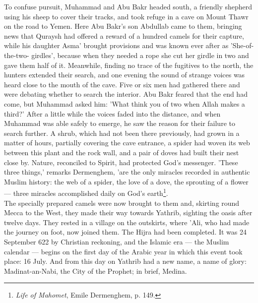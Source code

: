 \documentclass[11pt, b5paper, twoside]{book}
\begin{document}
To confuse pursuit, Muhammad and Abu Bakr headed south, a friendly shepherd using his sheep to cover 
their tracks, and took refuge in a cave on Mount Thawr on the road to Yemen. Here Abu Bakr's son 
Abdullab came to them, bringing news that Quraysh had offered a reward of a hundred camels for their 
capture, while his daughter Asma' brought provisions and was known ever after as 'She-of-the-two-
girdles', because when they needed a rope she cut her girdle in two and gave them half of it. 
Meanwhile, finding no trace of the fugitives to the north, the hunters extended their search, and one 
evening the sound of strange voices was heard close to the mouth of the cave. Five or six men had 
gathered there and were debating whether to search the interior. Abu Bakr feared that the end had 
come, but Muhammad asked him: 'What think you of two when Allah makes a third?' After a little while 
the voices faded into the distance, and when Muhammad was able safely to emerge, he saw the reason 
for their failure to search further. A shrub, which had not been there previously, had grown in a 
matter of hours, partially covering the cave entrance, a spider had woven its web between this plant 
and the rock wall, and a pair of doves had built their nest close by. Nature, reconciled to Spirit, 
had protected God's messenger. 'These three things,' remarks Dermenghem, 'are the only miracles 
recorded in authentic Muslim history: the web of a spider, the love of a dove, the sprouting of a 
flower --- three miracles accomplished daily on God's earth\footnote{\emph{Life of Mahomet}, Emile Dermenghem, p. 149.}. \\

The specially prepared camels were now brought to them and, skirting round Mecca to the West, they 
made their way towards Yathrib, sighting the oasis after twelve days. They rested in a village on the 
outskirts, where 'Ali, who had made the journey on foot, now joined them. The Hijra had been 
completed. It was 24 September 622 by Christian reckoning, and the Islamic era --- the Muslim calendar 
--- begins on the first day of the Arabic year in which this event took place: 16 July. And from this 
day on Yathrib had a new name, a name of glory: Madinat-an-Nabi, the City of the Prophet; in brief, 
Medina. \\
\end{document}
